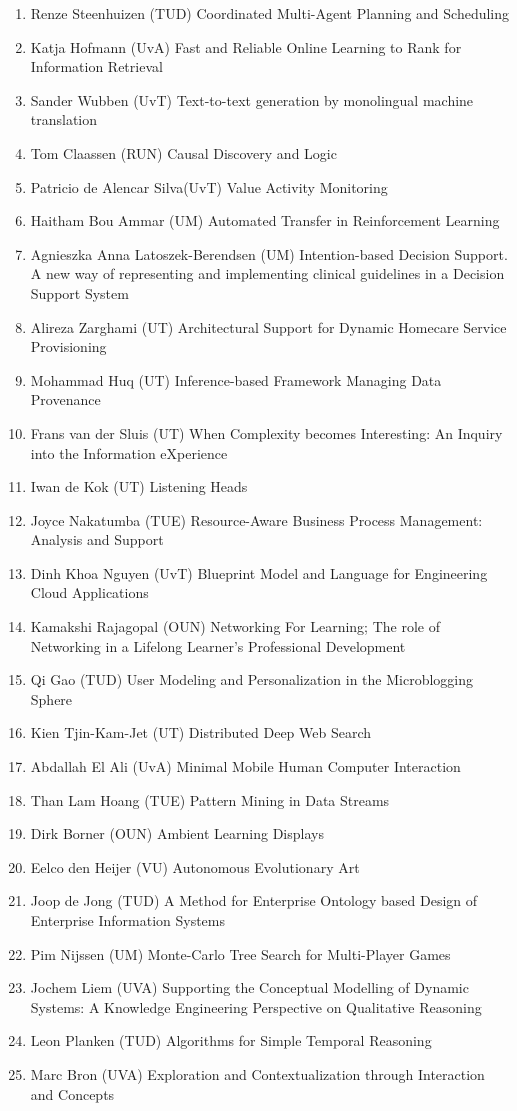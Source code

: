 \begin{multicols}{2}
\begin{scriptsize}
\begin{enumerate}[leftmargin=*,noitemsep,topsep=0pt,parsep=1pt,partopsep=0pt]
\item Renze Steenhuizen (TUD) Coordinated Multi-Agent Planning and Scheduling
\item Katja Hofmann (UvA) Fast and Reliable Online Learning to Rank for Information Retrieval
\item Sander Wubben (UvT) Text-to-text generation by monolingual machine translation
\item Tom Claassen (RUN) Causal Discovery and Logic
\item Patricio de Alencar Silva(UvT) Value Activity Monitoring
\item Haitham Bou Ammar (UM) Automated Transfer in Reinforcement Learning
\item Agnieszka Anna Latoszek-Berendsen (UM) Intention-based Decision Support. A new way of representing and implementing clinical guidelines in a Decision Support System
\item Alireza Zarghami (UT) Architectural Support for Dynamic Homecare Service Provisioning
\item Mohammad Huq (UT) Inference-based Framework Managing Data Provenance
\item Frans van der Sluis (UT) When Complexity becomes Interesting: An Inquiry into the Information eXperience
\item Iwan de Kok (UT) Listening Heads
\item Joyce Nakatumba (TUE) Resource-Aware Business Process Management: Analysis and Support
\item Dinh Khoa Nguyen (UvT) Blueprint Model and Language for Engineering Cloud Applications
\item Kamakshi Rajagopal (OUN) Networking For Learning; The role of Networking in a Lifelong Learner's Professional Development
\item Qi Gao (TUD) User Modeling and Personalization in the Microblogging Sphere
\item Kien Tjin-Kam-Jet (UT) Distributed Deep Web Search
\item Abdallah El Ali (UvA) Minimal Mobile Human Computer Interaction
\item Than Lam Hoang (TUE) Pattern Mining in Data Streams
\item Dirk Borner (OUN) Ambient Learning Displays
\item Eelco den Heijer (VU) Autonomous Evolutionary Art
\item Joop de Jong (TUD) A Method for Enterprise Ontology based Design of Enterprise Information Systems
\item Pim Nijssen (UM) Monte-Carlo Tree Search for Multi-Player Games
\item Jochem Liem (UVA) Supporting the Conceptual Modelling of Dynamic Systems: A Knowledge Engineering Perspective on Qualitative Reasoning
\item Leon Planken (TUD) Algorithms for Simple Temporal Reasoning
\item Marc Bron (UVA) Exploration and Contextualization through Interaction and Concepts
\end{enumerate}


\end{scriptsize}
\end{multicols}
